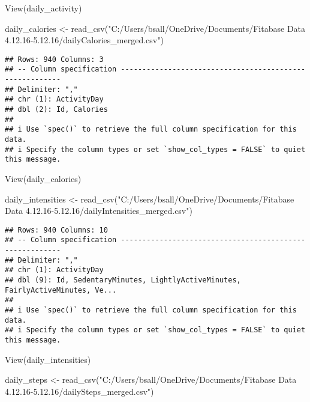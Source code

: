 \documentclass[
]{article}
\newenvironment{Shaded}{\begin{snugshade}}{\end{snugshade}}
\newcommand{\FunctionTok}[1]{\textcolor[rgb]{0.00,0.00,0.00}{#1}}
\newcommand{\NormalTok}[1]{#1}
\newcommand{\OtherTok}[1]{\textcolor[rgb]{0.56,0.35,0.01}{#1}}
\newcommand{\StringTok}[1]{\textcolor[rgb]{0.31,0.60,0.02}{#1}}
\begin{document}
\begin{Shaded}
\begin{Highlighting}[]
\FunctionTok{View}\NormalTok{(daily\_activity)}

\NormalTok{daily\_calories }\OtherTok{\textless{}{-}} \FunctionTok{read\_csv}\NormalTok{(}\StringTok{"C:/Users/bsall/OneDrive/Documents/Fitabase Data 4.12.16{-}5.12.16/dailyCalories\_merged.csv"}\NormalTok{)}
\end{Highlighting}
\end{Shaded}

\begin{verbatim}
## Rows: 940 Columns: 3
## -- Column specification --------------------------------------------------------
## Delimiter: ","
## chr (1): ActivityDay
## dbl (2): Id, Calories
## 
## i Use `spec()` to retrieve the full column specification for this data.
## i Specify the column types or set `show_col_types = FALSE` to quiet this message.
\end{verbatim}

\begin{Shaded}
\begin{Highlighting}[]
\FunctionTok{View}\NormalTok{(daily\_calories)}

\NormalTok{daily\_intensities }\OtherTok{\textless{}{-}} \FunctionTok{read\_csv}\NormalTok{(}\StringTok{"C:/Users/bsall/OneDrive/Documents/Fitabase Data 4.12.16{-}5.12.16/dailyIntensities\_merged.csv"}\NormalTok{)}
\end{Highlighting}
\end{Shaded}

\begin{verbatim}
## Rows: 940 Columns: 10
## -- Column specification --------------------------------------------------------
## Delimiter: ","
## chr (1): ActivityDay
## dbl (9): Id, SedentaryMinutes, LightlyActiveMinutes, FairlyActiveMinutes, Ve...
## 
## i Use `spec()` to retrieve the full column specification for this data.
## i Specify the column types or set `show_col_types = FALSE` to quiet this message.
\end{verbatim}

\begin{Shaded}
\begin{Highlighting}[]
\FunctionTok{View}\NormalTok{(daily\_intensities)}

\NormalTok{daily\_steps }\OtherTok{\textless{}{-}} \FunctionTok{read\_csv}\NormalTok{(}\StringTok{"C:/Users/bsall/OneDrive/Documents/Fitabase Data 4.12.16{-}5.12.16/dailySteps\_merged.csv"}\NormalTok{)}
\end{Highlighting}
\end{Shaded}
\end{document}
